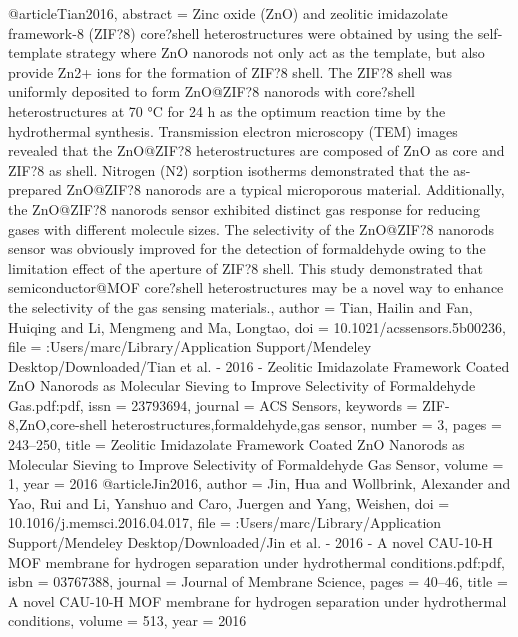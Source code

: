 @article{Tian2016,
abstract = {Zinc oxide (ZnO) and zeolitic imidazolate framework-8 (ZIF?8) core?shell heterostructures were obtained by using the self-template strategy where ZnO nanorods not only act as the template, but also provide Zn2+ ions for the formation of ZIF?8 shell. The ZIF?8 shell was uniformly deposited to form ZnO@ZIF?8 nanorods with core?shell heterostructures at 70 °C for 24 h as the optimum reaction time by the hydrothermal synthesis. Transmission electron microscopy (TEM) images revealed that the ZnO@ZIF?8 heterostructures are composed of ZnO as core and ZIF?8 as shell. Nitrogen (N2) sorption isotherms demonstrated that the as-prepared ZnO@ZIF?8 nanorods are a typical microporous material. Additionally, the ZnO@ZIF?8 nanorods sensor exhibited distinct gas response for reducing gases with different molecule sizes. The selectivity of the ZnO@ZIF?8 nanorods sensor was obviously improved for the detection of formaldehyde owing to the limitation effect of the aperture of ZIF?8 shell. This study demonstrated that semiconductor@MOF core?shell heterostructures may be a novel way to enhance the selectivity of the gas sensing materials.},
author = {Tian, Hailin and Fan, Huiqing and Li, Mengmeng and Ma, Longtao},
doi = {10.1021/acssensors.5b00236},
file = {:Users/marc/Library/Application Support/Mendeley Desktop/Downloaded/Tian et al. - 2016 - Zeolitic Imidazolate Framework Coated ZnO Nanorods as Molecular Sieving to Improve Selectivity of Formaldehyde Gas.pdf:pdf},
issn = {23793694},
journal = {ACS Sensors},
keywords = {ZIF-8,ZnO,core-shell heterostructures,formaldehyde,gas sensor},
number = {3},
pages = {243--250},
title = {{Zeolitic Imidazolate Framework Coated ZnO Nanorods as Molecular Sieving to Improve Selectivity of Formaldehyde Gas Sensor}},
volume = {1},
year = {2016}
}
@article{Jin2016,
author = {Jin, Hua and Wollbrink, Alexander and Yao, Rui and Li, Yanshuo and Caro, Juergen and Yang, Weishen},
doi = {10.1016/j.memsci.2016.04.017},
file = {:Users/marc/Library/Application Support/Mendeley Desktop/Downloaded/Jin et al. - 2016 - A novel CAU-10-H MOF membrane for hydrogen separation under hydrothermal conditions.pdf:pdf},
isbn = {03767388},
journal = {Journal of Membrane Science},
pages = {40--46},
title = {{A novel CAU-10-H MOF membrane for hydrogen separation under hydrothermal conditions}},
volume = {513},
year = {2016}
}
